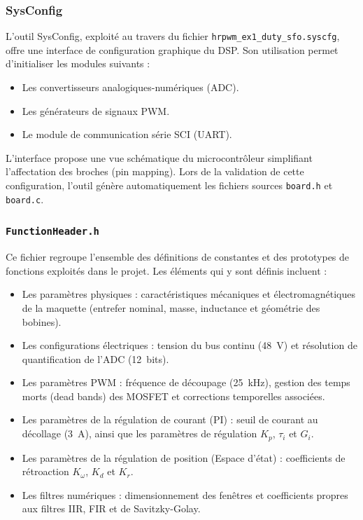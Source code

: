 \subsubsection{SysConfig}
\label{subsubsec:SysConfig}
L'outil SysConfig, exploité au travers du fichier \texttt{hrpwm\_ex1\_duty\_sfo.syscfg}, offre une interface de configuration graphique du DSP. Son utilisation permet d'initialiser les modules suivants :

\begin{itemize}
    \item Les convertisseurs analogiques-numériques (ADC).
    \item Les générateurs de signaux PWM.
    \item Le module de communication série SCI (UART).
\end{itemize}

L'interface propose une vue schématique du microcontrôleur simplifiant l'affectation des broches (pin mapping). Lors de la validation de cette configuration, l'outil génère automatiquement les fichiers sources \texttt{board.h} et \texttt{board.c}.

\subsubsection{\texttt{FunctionHeader.h}}
\label{subsubsec:FunctionHeader}
Ce fichier regroupe l'ensemble des définitions de constantes et des prototypes de fonctions exploités dans le projet. Les éléments qui y sont définis incluent :

\begin{itemize}
    \item Les paramètres physiques : caractéristiques mécaniques et électromagnétiques de la maquette (entrefer nominal, masse, inductance et géométrie des bobines).
    \item Les configurations électriques : tension du bus continu (48~V) et résolution de quantification de l'ADC (12~bits).
    \item Les paramètres PWM : fréquence de découpage (25~kHz), gestion des temps morts (dead bands) des MOSFET et corrections temporelles associées.
    \item Les paramètres de la régulation de courant (PI) : seuil de courant au décollage (3~A), ainsi que les paramètres de régulation $K_p$, $\tau_i$ et $G_i$.
    \item Les paramètres de la régulation de position (Espace d'état) : coefficients de rétroaction $K_\omega$, $K_d$ et $K_r$.
    \item Les filtres numériques : dimensionnement des fenêtres et coefficients propres aux filtres IIR, FIR et de Savitzky-Golay.
\end{itemize}

